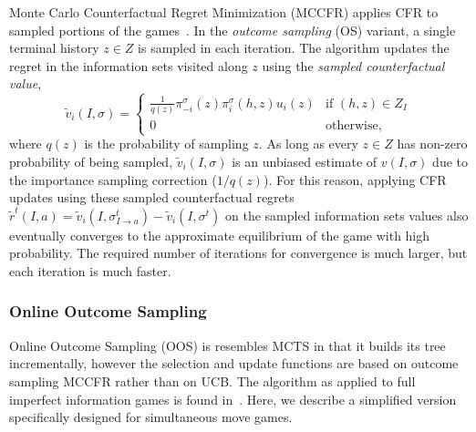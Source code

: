Monte Carlo Counterfactual Regret Minimization (MCCFR) applies CFR to sampled portions of the games~\cite{Lanctot09Sampling}.
In the {\it outcome sampling} (OS) variant, a single terminal history $z\in Z$ is sampled in each iteration.
The algorithm updates the regret in the information sets visited along $z$ using the
{\it sampled counterfactual value},
\begin{equation}
\tilde{v}_i(I,\sigma) = \left\{
\begin{array}{ll}
\frac{1}{q(z)} \pi^{\sigma}_{-i}(z) \pi^{\sigma}_{i}(h,z) u_i(z) & \mbox{if } (h,z) \in Z_I\\
0  & \mbox{otherwise,}
\end{array} \right.
\label{eq:scv}
\end{equation}
where $q(z)$ is the probability of sampling $z$.
As long as every $z \in Z$ has non-zero probability of being sampled, $\tilde{v}_i(I,\sigma)$ is an unbiased estimate of $v(I,\sigma)$
due to the importance sampling correction ($1/q(z)$). For this reason, applying CFR updates using these sampled counterfactual regrets
$\tilde{r}^t(I,a) = \tilde{v}_i(I,\sigma^t_{I \rightarrow a}) - \tilde{v}_i(I,\sigma^t)$
on the sampled information sets values also eventually converges to the approximate equilibrium of the game with high probability.
The required number of iterations for convergence is much larger, but each iteration is much faster.



\subsubsection{Online Outcome Sampling} \label{sec:oos}

Online Outcome Sampling (OOS) is resembles MCTS in that it builds its tree incrementally, however the selection 
and update functions are based on outcome sampling MCCFR rather than on UCB. The algorithm as applied to full 
imperfect information games is found in~\cite{Lanctot14OOS}. Here, we describe a simplified version specifically 
designed for simultaneous move games. 

